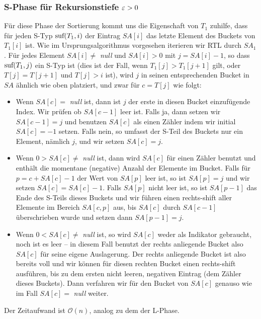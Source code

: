 \subsubsection{ S-Phase für Rekursionstiefe $\varepsilon > 0$}

Für diese Phase der Sortierung kommt uns die Eigenschaft von $T_1$ zuhilfe, dass für jeden S-Typ $\text{suf}(T_1, i)$ der Eintrag $SA[i]$ das letzte Element des Buckets von $T_1[i]$ ist. Wie im Ursprungsalgorithmus vorgesehen iterieren wir RTL durch $SA_1$. Für jedes Element $SA[i] \neq $ \textit{null} und $SA[i] > 0$ mit $j = SA[i] -1$, so dass $\text{suf}(T_1,j)$ ein S-Typ ist (dies ist der Fall, wenn $T_1[j] > T_1[j+1]$ gilt, oder $T[j] = T[j+1]$ und $T[j] > i$ ist), wird $j$ in seinen entsprechenden Bucket in $SA$ ähnlich wie oben platziert, und zwar für $c = T[j]$ wie folgt:

\begin{itemize}
\item Wenn $SA[c] = $ \textit{null} ist, dann ist $j$ der erste in diesen Bucket einzufügende Index. Wir prüfen ob $SA[c-1]$ leer ist. Falls ja, dann setzen wir $SA[c-1] = j$ und benutzen $SA[c]$ als einen Zähler indem wir initial $SA[c] = -1$ setzen. Falls nein, so umfasst der S-Teil des Buckets nur ein Element, nämlich $j$, und wir setzen $SA[c] = j$.
\item Wenn $ 0 > SA[c] \neq$ \textit{null} ist, dann wird $SA[c]$ für einen Zähler benutzt und enthält die momentane (negative) Anzahl der Elemente im Bucket. Falls für $p = c + SA[c] - 1$ der Wert von $SA[p]$ leer ist, so ist $SA[p] = j$ und wir setzen $SA[c] = SA[c] - 1$. Falls $SA[p]$ nicht leer ist, so ist $SA[p-1]$ das Ende des S-Teils dieses Buckets und wir führen einen rechts-shift aller Elemente im Bereich $SA[c, p]$ aus, bis $SA[c]$ durch $SA[c-1]$ überschrieben wurde und setzen dann $SA[p-1] = j$.
\item Wenn $ 0 < SA[c] \neq$ \textit{null} ist, so wird $SA[c]$ weder als Indikator gebraucht, noch ist es leer -- in diesem Fall benutzt der rechts anliegende Bucket also $SA[c]$ für seine eigene Auslagerung. Der rechts anliegende Bucket ist also bereits voll und wir können für diesen rechten Bucket einen rechts-shift ausführen, bis zu dem ersten nicht leeren, negativen Eintrag (dem Zähler dieses Buckets). Dann verfahren wir für den Bucket von $SA[c]$ genauso wie im Fall $SA[c] = $ \textit{null} weiter.
\end{itemize}

Der Zeitaufwand ist $\mathcal O(n)$, analog zu dem der L-Phase.

